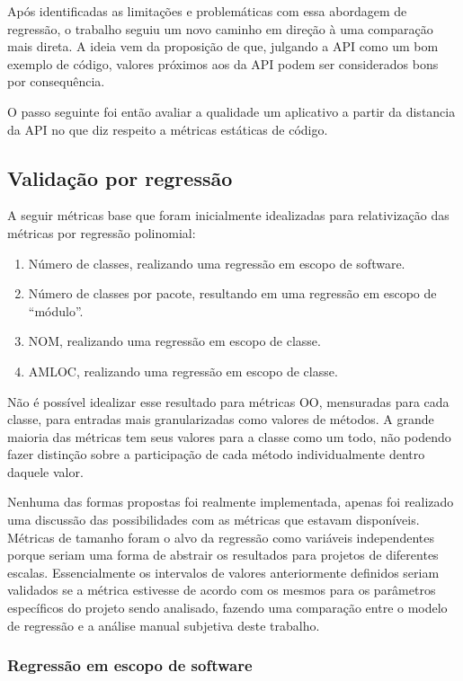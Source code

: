 Após identificadas as limitações e problemáticas com essa abordagem de regressão, o trabalho seguiu um novo caminho em direção à uma comparação mais direta. A ideia vem da proposição de que, julgando a API como um bom exemplo de código, valores próximos aos da API podem ser considerados bons por consequência. 

O passo seguinte foi então avaliar a qualidade um aplicativo a partir da distancia da API no que diz respeito a métricas estáticas de código.

\subsection{Validação por regressão}

A seguir métricas base que foram inicialmente idealizadas para relativização das métricas por regressão polinomial:

\begin{enumerate}
\item Número de classes, realizando uma regressão em escopo de software.
\item Número de classes por pacote, resultando em uma regressão em escopo de ``módulo''.
\item NOM, realizando uma regressão em escopo de classe.
\item AMLOC, realizando uma regressão em escopo de classe.
\end{enumerate}

Não é possível idealizar esse resultado para métricas OO, mensuradas para cada classe, para entradas mais granularizadas como valores de métodos. A grande maioria das métricas tem seus valores para a classe como um todo, não podendo fazer distinção sobre a participação de cada método individualmente dentro daquele valor.

Nenhuma das formas propostas foi realmente implementada, apenas foi realizado uma discussão das possibilidades com as métricas que estavam disponíveis. Métricas de tamanho foram o alvo da regressão como variáveis independentes porque seriam uma forma de abstrair os resultados para projetos de diferentes escalas. Essencialmente os intervalos de valores anteriormente definidos seriam validados se a métrica estivesse de acordo com os mesmos para os parâmetros específicos do projeto sendo analisado, fazendo uma comparação entre o modelo de regressão e a análise manual subjetiva deste trabalho.

\subsubsection{Regressão em escopo de software}

